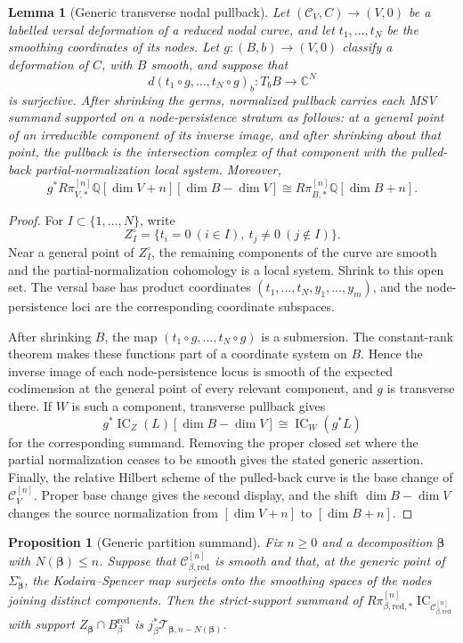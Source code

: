 \documentclass[11pt,reqno]{amsart}
\newtheorem{proposition}[theorem]{Proposition}
\newtheorem{lemma}[theorem]{Lemma}
\theoremstyle{definition}
\newcommand{\C}{\mathbb C}
\newcommand{\Q}{\mathbb Q}
\newcommand{\IC}{\operatorname{IC}}
\newcommand{\red}{\mathrm{red}}
\begin{document}
\begin{lemma}[Generic transverse nodal pullback]
\label{lem:transverse-nodal-base-change}
Let $(\mathcal C_V,C)\to(V,0)$ be a labelled versal deformation of a
reduced nodal curve, and let $t_1,\ldots,t_N$ be the smoothing coordinates
of its nodes.  Let $g:(B,b)\to(V,0)$ classify a deformation of $C$, with
$B$ smooth, and suppose that
\[
 d(t_1\circ g,\ldots,t_N\circ g)_b:T_bB\longrightarrow\C^N
\]
is surjective.  After shrinking the germs, normalized pullback carries each
MSV summand supported on a node-persistence stratum as follows: at a general
point of an irreducible component of its inverse image, and after shrinking
about that point, the pullback is the intersection complex of that component
with the pulled-back partial-normalization local system.  Moreover,
\[
 g^*R\pi_{V,*}^{[n]}\Q[\dim V+n][\dim B-\dim V]
 \cong R\pi_{B,*}^{[n]}\Q[\dim B+n].
\]
\end{lemma}

\begin{proof}
For $I\subset\{1,\ldots,N\}$, write
\[
 Z_I^\circ=\{t_i=0\ (i\in I),\ t_j\ne0\ (j\notin I)\}.
\]
Near a general point of $Z_I^\circ$, the remaining components of the curve
are smooth and the partial-normalization cohomology is a local system.
Shrink to this open set.  The versal base has product coordinates
$(t_1,\ldots,t_N,y_1,\ldots,y_m)$, and the node-persistence loci are the
corresponding coordinate subspaces.

After shrinking $B$, the map
$(t_1\circ g,\ldots,t_N\circ g)$ is a submersion.  The constant-rank theorem
makes these functions part of a coordinate system on $B$.  Hence the inverse
image of each node-persistence locus is smooth of the expected codimension
at the general point of every relevant component, and $g$ is transverse
there.  If $W$ is such a component, transverse pullback gives
\[
 g^*\IC_Z(L)[\dim B-\dim V]
 \cong\IC_W(g^*L)
\]
for the corresponding summand.  Removing the proper closed set where the
partial normalization ceases to be smooth gives the stated generic
assertion.  Finally, the relative
Hilbert scheme of the pulled-back curve is the base change of
$\mathcal C_V^{[n]}$.  Proper base change gives the second display, and the
shift $\dim B-\dim V$ changes the source normalization from
$[\dim V+n]$ to $[\dim B+n]$.
\end{proof}

\begin{proposition}[Generic partition summand]
\label{prop:generic-partition}
Fix $n\ge0$ and a decomposition $\boldsymbol\beta$ with
$N(\boldsymbol\beta)\le n$.  Suppose that
$\mathcal C_{\beta,\red}^{[n]}$ is smooth and that, at the generic point of
$\Sigma_{\boldsymbol\beta}^{\circ}$, the Kodaira--Spencer map surjects onto
the smoothing spaces of the nodes joining distinct components.  Then the
strict-support summand of
$R\pi_{\beta,\red,*}^{[n]}
\IC_{\mathcal C_{\beta,\red}^{[n]}}$ with support
$Z_{\boldsymbol\beta}\cap B_\beta^{\red}$ is
$j_\beta^*\mathcal T_{\boldsymbol\beta,n-N(\boldsymbol\beta)}$.
\end{proposition}
\end{document}
